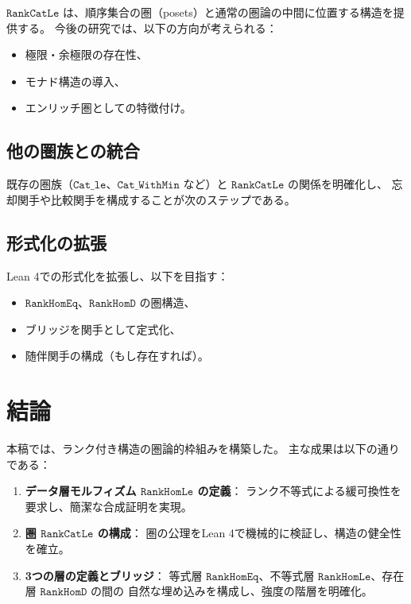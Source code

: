 \documentclass[11pt,a4paper,ja=standard]{bxjsarticle}
\theoremstyle{definition}
\newcommand{\RankHomLe}{\mathtt{RankHomLe}}
\newcommand{\RankHomEq}{\mathtt{RankHomEq}}
\newcommand{\RankHomD}{\mathtt{RankHomD}}
\newcommand{\RankCatLe}{\mathtt{RankCatLe}}
\begin{document}
$\RankCatLe$ は、順序集合の圏（posets）と通常の圏論の中間に位置する構造を提供する。
今後の研究では、以下の方向が考えられる：

\begin{itemize}
\item 極限・余極限の存在性、
\item モナド構造の導入、
\item エンリッチ圏としての特徴付け。
\end{itemize}

\subsection{他の圏族との統合}

既存の圏族（$\mathtt{Cat\_le}$、$\mathtt{Cat\_WithMin}$ など）と $\RankCatLe$ の関係を明確化し、
忘却関手や比較関手を構成することが次のステップである。

\subsection{形式化の拡張}

Lean 4での形式化を拡張し、以下を目指す：

\begin{itemize}
\item $\RankHomEq$、$\RankHomD$ の圏構造、
\item ブリッジを関手として定式化、
\item 随伴関手の構成（もし存在すれば）。
\end{itemize}

\section{結論}

本稿では、ランク付き構造の圏論的枠組みを構築した。
主な成果は以下の通りである：

\begin{enumerate}
\item \textbf{データ層モルフィズム $\RankHomLe$ の定義}：
ランク不等式による緩可換性を要求し、簡潔な合成証明を実現。

\item \textbf{圏 $\RankCatLe$ の構成}：
圏の公理をLean 4で機械的に検証し、構造の健全性を確立。

\item \textbf{3つの層の定義とブリッジ}：
等式層 $\RankHomEq$、不等式層 $\RankHomLe$、存在層 $\RankHomD$ の間の
自然な埋め込みを構成し、強度の階層を明確化。
\end{enumerate}
\end{document}
